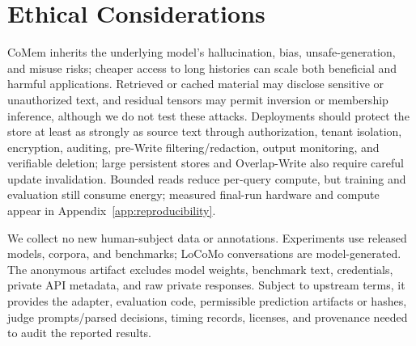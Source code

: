 \section*{Ethical Considerations}
CoMem inherits the underlying model's hallucination, bias, unsafe-generation,
and misuse risks; cheaper access to long histories can scale both beneficial and
harmful applications. Retrieved or cached material may disclose sensitive or
unauthorized text, and residual tensors may permit inversion or membership
inference, although we do not test these attacks. Deployments should protect the
store at least as strongly as source text through authorization, tenant
isolation, encryption, auditing, pre-Write filtering/redaction, output
monitoring, and verifiable deletion; large persistent stores and Overlap-Write
also require careful update invalidation. Bounded reads reduce per-query compute,
but training and evaluation still consume energy; measured final-run hardware
and compute appear in Appendix~\ref{app:reproducibility}.

We collect no new human-subject data or annotations. Experiments use released
models, corpora, and benchmarks; LoCoMo conversations are model-generated. The
anonymous artifact excludes model weights, benchmark text, credentials, private
API metadata, and raw private responses. Subject to upstream terms, it provides
the adapter, evaluation code, permissible prediction artifacts or hashes, judge
prompts/parsed decisions, timing records, licenses, and provenance needed to
audit the reported results.
